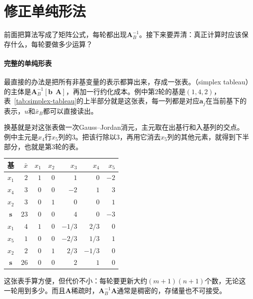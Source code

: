 \section{修正单纯形法}
\label{sec:simplex-revised}

前面把算法写成了矩阵公式，每轮都出现$\bm{A}_B^{-1}$。接下来要弄清：真正计算时应该保存什么，每轮要做多少运算？

\paragraph{完整的单纯形表}
最直接的办法是把所有非基变量的表示都算出来，存成一张表。（simplex tableau）的主体是$\bm{A}_B^{-1}[\bm{b}\ \ \bm{A}]$，再加一行约化成本。例中第$2$轮的基是$(1,4,2)$，表~\ref{tab:simplex-tableau}的上半部分就是这张表，每一列都是对应$\bm{a}_j$在当前基下的表示，$u$和$\bar{x}_B$都可以直接读出。

换基就是对这张表做一次Gauss--Jordan消元，主元取在出基行和入基列的交点。例中主元是$x_4$行$x_5$列的$3$。把该行除以$3$，再用它消去$x_5$列的其他元素，就得到下半部分，也就是第$3$轮的表。

\begin{BookInlineTable}
 \centering
 \begin{tabular}{crrrrrr}
  \toprule
  基 & $\bar{x}$ & $x_1$ & $x_2$ & $x_3$ & $x_4$ & $x_5$\\
  \midrule
  $x_1$ & $2$ & $1$ & $0$ & $1$ & $0$ & $-2$\\
  $x_4$ & $3$ & $0$ & $0$ & $-2$ & $1$ & $3$\\
  $x_2$ & $3$ & $0$ & $1$ & $0$ & $0$ & $1$\\
  $\bm{s}$ & $23$ & $0$ & $0$ & $4$ & $0$ & $-3$\\
  \midrule
  $x_1$ & $4$ & $1$ & $0$ & $-1/3$ & $2/3$ & $0$\\
  $x_5$ & $1$ & $0$ & $0$ & $-2/3$ & $1/3$ & $1$\\
  $x_2$ & $2$ & $0$ & $1$ & $2/3$ & $-1/3$ & $0$\\
  $\bm{s}$ & $26$ & $0$ & $0$ & $2$ & $1$ & $0$\\
  \bottomrule
 \end{tabular}
 \caption{资源配置问题第$2$轮（上）和第$3$轮（下）的单纯形表。第二列是基变量取值，$\bm{s}$行第二列是利润$-f$，其余是约化成本。}
 \label{tab:simplex-tableau}
\end{BookInlineTable}

这张表手算方便，但代价不小：每轮要更新大约$(m+1)(n+1)$个数，无论这一轮用到多少。而且$\bm{A}$稀疏时，$\bm{A}_B^{-1}\bm{A}$通常是稠密的，存储量也不可接受。

